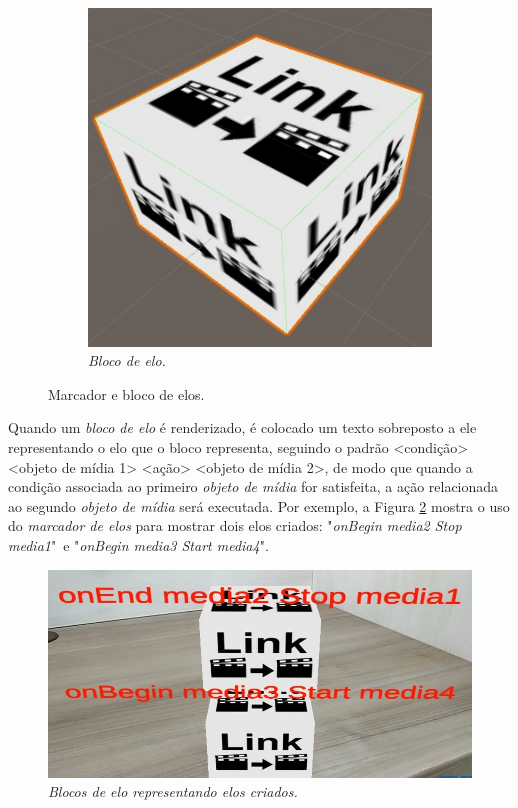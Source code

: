\documentclass[../main.tex]{subfiles}
\begin{document}
\begin{figure}[!h]
\begin{subfigure}{0.3\linewidth}
    \includegraphics[width=1\linewidth]{IMG/Blocos/eloblock.jpg}
    \caption{\textit{Bloco de elo.}}
  \end{subfigure}
\caption{Marcador e bloco de elos.}
\label{fig:elo}
\end{figure}


Quando um \emph{bloco de elo} é renderizado, é colocado um texto sobreposto a ele representando o elo que o bloco representa, seguindo o padrão <condição> <objeto de mídia 1> <ação> <objeto de mídia 2>, de modo que quando a condição associada ao primeiro \emph{objeto de mídia} for satisfeita, a ação relacionada ao segundo \emph{objeto de mídia} será executada. Por exemplo, a Figura \ref{fig:elos} mostra o uso do \emph{marcador de elos} para mostrar dois elos criados: "\emph{onBegin media2 Stop media1}"~e "\emph{onBegin media3 Start media4}".

\begin{figure}[!ht]
\centering
\includegraphics[width=0.6\linewidth]{IMG/Blocos/linksblock.jpg}
\caption{\textit{\emph{Blocos de elo} representando elos criados.}}
\label{fig:elos}
\end{figure}
\end{document}
